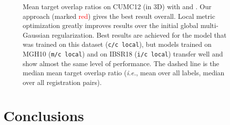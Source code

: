 \documentclass[10pt,twocolumn,letterpaper,table]{article}
\numberwithin{equation}{section}
\theoremstyle{plain}
\theoremstyle{definition}
\def\ie{\emph{i.e.}}  \def\Ie{\emph{I.e.}}
\begin{document}
\begin{figure}
  
  \caption{Mean target overlap ratios on CUMC12 (in 3D) with  and . Our approach (marked \textcolor{red}{red}) gives the best result overall. Local metric optimization greatly improves results over the initial global multi-Gaussian regularization. Best results are achieved for the model that was trained on this dataset (\texttt{c/c local}), but models trained on MGH10 (\texttt{m/c local}) and on IBSR18 (\texttt{i/c local}) transfer well and show almost the same level of performance.
    The dashed line is the median mean target overlap ratio (\ie, mean over all labels, median over all registration pairs).}
  \label{fig:boxplot_overlap_3d_test_cumc12}
  \vspace{-0.3cm}
\end{figure}

\begin{table}
  \caption{Mean (standard deviation) of \emph{determinant of Jacobian} of  for global and local regularization with  and  for CUMC12 within the brain. Local metric optimization (local) improves target overlap measures (see Fig.~\ref{fig:boxplot_overlap_3d_test_cumc12}) at the cost of less regular deformations than for global multi-Gaussian regularization. However, the reported determinants of Jacobian are still all positive, indicating no folding.}
  \label{tab:jacobian_across_stages_cumc12_3d}
  \vspace{-0.3cm}
 \end{table}

\vspace{-0.2cm}
\section{Conclusions}
\label{sec:discussion}
\end{document}
